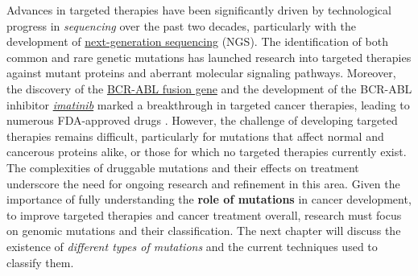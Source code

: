 Advances in targeted therapies have been significantly driven by technological progress in \textit{sequencing} over the past two decades, particularly with the development of \href{https://en.wikipedia.org/wiki/Massive_parallel_sequencing}{next-generation sequencing} (NGS). The identification of both common and rare genetic mutations has launched research into targeted therapies against mutant proteins and aberrant molecular signaling pathways. Moreover, the discovery of the \href{https://en.wikipedia.org/wiki/Philadelphia_chromosome}{BCR-ABL fusion gene} and the development of the BCR-ABL inhibitor \href{https://en.wikipedia.org/wiki/Imatinib}{\textit{imatinib}} marked a breakthrough in targeted cancer therapies, leading to numerous FDA-approved drugs \cite{jci}. However, the challenge of developing targeted therapies remains difficult, particularly for mutations that affect normal and cancerous proteins alike, or those for which no targeted therapies currently exist. The complexities of druggable mutations and their effects on treatment underscore the need for ongoing research and refinement in this area. Given the importance of fully understanding the \textbf{role of mutations} in cancer development, to improve targeted therapies and cancer treatment overall, research must focus on genomic mutations and their classification. The next chapter will discuss the existence of \textit{different types of mutations} and the current techniques used to classify them.

\cleardoublepage
